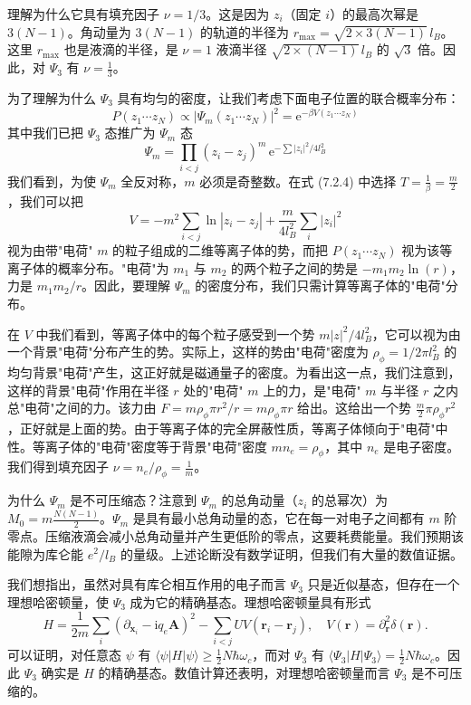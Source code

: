 理解为什么它具有填充因子 $\nu=1/3$。这是因为 $z_i$（固定 $i$）的最高次幂是 $3(N-1)$。角动量为 $3(N-1)$ 的轨道的半径为 $r_{\max}=\sqrt{2\times 3(N-1)}\,l_B$。这里 $r_{\max}$ 也是液滴的半径，是 $\nu=1$ 液滴半径 $\sqrt{2\times(N-1)}\,l_B$ 的 $\sqrt{3}$ 倍。因此，对 $\Psi_3$ 有 $\nu=\frac{1}{3}$。

为了理解为什么 $\Psi_3$ 具有均匀的密度，让我们考虑下面电子位置的联合概率分布：
\begin{equation*}
P(z_1\cdots z_N)\propto|\Psi_m(z_1\cdots z_N)|^2=\mathrm{e}^{-\beta V(z_1\cdots z_N)}
\tag{7.2.4}
\end{equation*}
其中我们已把 $\Psi_3$ 态推广为 $\Psi_m$ 态
\begin{equation*}
\Psi_m=\prod_{i<j}(z_i-z_j)^m\,\mathrm{e}^{-\sum|z_i|^2/4l_B^2}
\end{equation*}
我们看到，为使 $\Psi_m$ 全反对称，$m$ 必须是奇整数。在式 (7.2.4) 中选择 $T=\frac{1}{\beta}=\frac{m}{2}$，我们可以把
\begin{equation*}
V=-m^2\sum_{i<j}\ln|z_i-z_j|+\frac{m}{4l_B^2}\sum_i|z_i|^2
\end{equation*}
视为由带"电荷" $m$ 的粒子组成的二维等离子体的势，而把 $P(z_1\cdots z_N)$ 视为该等离子体的概率分布。"电荷"为 $m_1$ 与 $m_2$ 的两个粒子之间的势是 $-m_1m_2\ln(r)$，力是 $m_1m_2/r$。因此，要理解 $\Psi_m$ 的密度分布，我们只需计算等离子体的"电荷"分布。

在 $V$ 中我们看到，等离子体中的每个粒子感受到一个势 $m|z|^2/4l_B^2$，它可以视为由一个背景"电荷"分布产生的势。实际上，这样的势由"电荷"密度为 $\rho_\phi=1/2\pi l_B^2$ 的均匀背景"电荷"产生，这正好就是磁通量子的密度。为看出这一点，我们注意到，这样的背景"电荷"作用在半径 $r$ 处的"电荷" $m$ 上的力，是"电荷" $m$ 与半径 $r$ 之内总"电荷"之间的力。该力由 $F=m\rho_\phi\pi r^2/r=m\rho_\phi\pi r$ 给出。这给出一个势 $\frac{m}{2}\pi\rho_\phi r^2$，正好就是上面的势。由于等离子体的完全屏蔽性质，等离子体倾向于"电荷"中性。等离子体的"电荷"密度等于背景"电荷"密度 $mn_e=\rho_\phi$，其中 $n_e$ 是电子密度。我们得到填充因子 $\nu=n_e/\rho_\phi=\frac{1}{m}$。

为什么 $\Psi_m$ 是不可压缩态？注意到 $\Psi_m$ 的总角动量（$z_i$ 的总幂次）为 $M_0=m\frac{N(N-1)}{2}$。$\Psi_m$ 是具有最小总角动量的态，它在每一对电子之间都有 $m$ 阶零点。压缩液滴会减小总角动量并产生更低阶的零点，这要耗费能量。我们预期该能隙为库仑能 $e^2/l_B$ 的量级。上述论断没有数学证明，但我们有大量的数值证据。

我们想指出，虽然对具有库仑相互作用的电子而言 $\Psi_3$ 只是近似基态，但存在一个理想哈密顿量，使 $\Psi_3$ 成为它的精确基态。理想哈密顿量具有形式
\begin{equation*}
H=\frac{1}{2m}\sum_i(\partial_{\pmb{x}_i}-\mathrm{i}q_e\pmb{A})^2-\sum_{i<j}UV(\pmb{r}_i-\pmb{r}_j),\quad V(\pmb{r})=\partial_{\pmb{r}}^2\delta(\pmb{r}).
\tag{7.2.5}
\end{equation*}
可以证明，对任意态 $\psi$ 有 $\langle\psi|H|\psi\rangle\geqslant\frac{1}{2}N\hbar\omega_c$，而对 $\Psi_3$ 有 $\langle\Psi_3|H|\Psi_3\rangle=\frac{1}{2}N\hbar\omega_c$。因此 $\Psi_3$ 确实是 $H$ 的精确基态。数值计算还表明，对理想哈密顿量而言 $\Psi_3$ 是不可压缩的。

